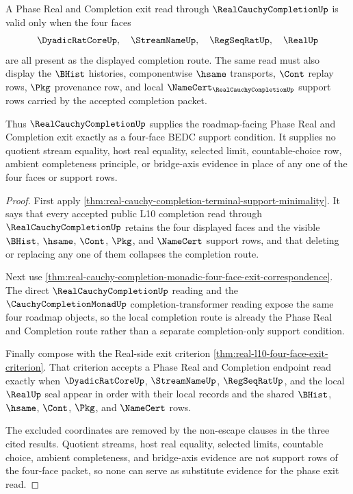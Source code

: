 \begin{theorem}
\label{thm:real-cauchy-completion-current-phase-four-face-support-minimality}
A Phase Real and Completion exit read through $\RealCauchyCompletionUp$ is valid only when the four faces
$$
\DyadicRatCoreUp,\quad \StreamNameUp,\quad \RegSeqRatUp,\quad \RealUp
$$
are all present as the displayed completion route. The same read must also display the $\BHist$ histories, componentwise $\hsame$ transports, $\Cont$ replay rows, $\Pkg$ provenance row, and local $\NameCert_{\RealCauchyCompletionUp}$ support rows carried by the accepted completion packet.

Thus $\RealCauchyCompletionUp$ supplies the roadmap-facing Phase Real and Completion exit exactly as a four-face BEDC support condition. It supplies no quotient stream equality, host real equality, selected limit, countable-choice row, ambient completeness principle, or bridge-axis evidence in place of any one of the four faces or support rows.
\end{theorem}
\begin{proof}
First apply \autoref{thm:real-cauchy-completion-terminal-support-minimality}. It says that every accepted public L10 completion read through $\RealCauchyCompletionUp$ retains the four displayed faces and the visible $\BHist$, $\hsame$, $\Cont$, $\Pkg$, and $\NameCert$ support rows, and that deleting or replacing any one of them collapses the completion route.

Next use \autoref{thm:real-cauchy-completion-monadic-four-face-exit-correspondence}. The direct $\RealCauchyCompletionUp$ reading and the $\CauchyCompletionMonadUp$ completion-transformer reading expose the same four roadmap objects, so the local completion route is already the Phase Real and Completion route rather than a separate completion-only support condition.

Finally compose with the Real-side exit criterion \autoref{thm:real-l10-four-face-exit-criterion}. That criterion accepts a Phase Real and Completion endpoint read exactly when $\DyadicRatCoreUp$, $\StreamNameUp$, $\RegSeqRatUp$, and the local $\RealUp$ seal appear in order with their local records and the shared $\BHist$, $\hsame$, $\Cont$, $\Pkg$, and $\NameCert$ rows.

The excluded coordinates are removed by the non-escape clauses in the three cited results. Quotient streams, host real equality, selected limits, countable choice, ambient completeness, and bridge-axis evidence are not support rows of the four-face packet, so none can serve as substitute evidence for the phase exit read.
\end{proof}

